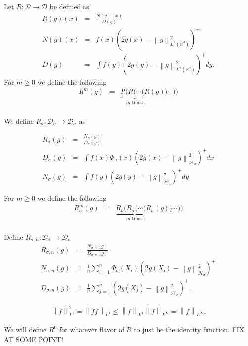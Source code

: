 \documentclass{article} %
\def\hsig{{\mathcal{H}_\sigma}}
\def\d2{{\mathcal{D}}}
\def\dsig{{\mathcal{D}_\sigma}}
\def\fm{{\Phi_\sigma}} %
\def\irwl{{R_{\sigma,n}}}
\def\girwl{{R_{\sigma}}}
\def\rn{\mathbb{R}}
\def\l{\left}
\def\r{\right}
\theoremstyle{definition}
\begin{document}
Let $R:\d2 \to \d2$ be defined as 
\begin{eqnarray*}
	R(g)(x) &=& \frac{N(g)(x)}{D(g)}\\
	N(g)(x) &=&f(x) \left( 2g(x) - \l\|g\r\|^2_{L^2\left( \rn^d \right)} \right)^+\\
	D(g) &=&\int f(y) \left( 2g(y) - \l\|g\r\|^2_{L^2\left( \rn^d \right)}\right)^+ dy.
\end{eqnarray*}
For $m\ge 0 $ we define the following
\begin{eqnarray*}
	R^m(g) &=& \underbrace{R(R(\cdots (R}_{m \text{ times}}(g)) \cdots )) \\
\end{eqnarray*}


We define $\girwl:\dsig \to \dsig$ as

\begin{eqnarray*}
	\girwl\left( g \right) &=& \frac{N_\sigma(g)}{D_\sigma(g)}\\
	D_\sigma(g) &=& \int f\left( x \right) \fm\left( x \right) \left( 2g\left( x \right) - \l\|g\r\|_\hsig^2 \right)^+ dx \\
	N_\sigma(g) &=& \int f\left( y \right)  \left( 2g\left( y \right) - \l\|g\r\|_\hsig^2 \right)^+ dy
\end{eqnarray*}

For $m\ge 0 $ we define the following
\begin{eqnarray*}
	R_\sigma^m(g) &=& \underbrace{R_\sigma(R_\sigma(\cdots (R_\sigma}_{m \text{ times}}(g)) \cdots )) \\
\end{eqnarray*}

Define $\irwl: \dsig \to \dsig$
\begin{eqnarray} \label{eqn:irwl}
	\irwl\left( g \right) &=& \frac{N_{\sigma,n}\left( g \right)}{D_{\sigma,n}(g)}\\
	N_{\sigma,n}(g) &=& \frac{1}{n}\sum_{i=1}^n \fm\left( X_i \right) \left( 2g\left( X_i \right) - \l\|g\r\|_\hsig^2 \right)^+\\
	D_{\sigma,n}\left( g \right) &=& \frac{1}{n}\sum_{j=1}^n  \left( 2g\left( X_j \right) - \l\|g\r\|_\hsig^2 \right)^+.
\end{eqnarray}

\begin{eqnarray*}
	\l\|f\r\|^2_{L^2} = \l\|ff\r\|_{L^1}\le \l\|f\r\|_{L^1} \l\|f\r\|_{L^\infty} = \l\|f\r\|_{L^\infty}.
\end{eqnarray*}

We will define $R^0$ for whatever flavor of $R$ to just be the identity function.  FIX AT SOME POINT!
\end{document}

